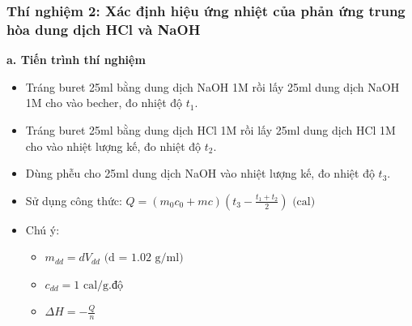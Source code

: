 \subsubsection{Thí nghiệm 2: Xác định hiệu ứng nhiệt của phản ứng trung hòa dung dịch HCl và NaOH}
\textbf{a. Tiến trình thí nghiệm}
\begin{itemize}
    \item Tráng buret 25ml bằng dung dịch NaOH 1M rồi lấy 25ml dung dịch NaOH 1M cho vào becher, đo nhiệt độ $t_1$.
    \item Tráng buret 25ml bằng dung dịch HCl 1M rồi lấy 25ml dung dịch HCl 1M cho vào nhiệt lượng kế, đo nhiệt độ $t_2$.
    \item Dùng phễu cho 25ml dung dịch NaOH vào nhiệt lượng kế, đo nhiệt độ $t_3$.
    \item Sử dụng công thức: $Q = (m_0c_0 + mc)(t_3 - \frac{t_1 + t_2}{2}) \text{ (cal)}$
    \item Chú ý:
    \begin{itemize}
        \item $m_{dd} = dV_{dd} \text{ (d = 1.02 g/ml)}$
        \item $c_{dd} = 1 \text{ cal/g.độ}$
        \item $\Delta H = -\frac{Q}{n}$
    \end{itemize}
\end{itemize}

